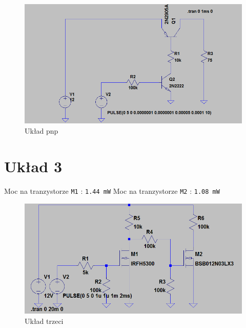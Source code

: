 \documentclass[wide,a4paper,titlepage,12pt] {article}
\begin{document}
  \begin{figure}[h!]
  \begin{center}
  \includegraphics[scale=.5]{ukl2-pnp.PNG}
  \caption{Układ pnp}
  \label{fig:main}
  \end{center}
  \end{figure}

\newpage

  \section{Układ 3}
  \paragraph{}
  Moc na tranzystorze \texttt{M1} : \texttt{1.44 mW}
  Moc na tranzystorze \texttt{M2} : \texttt{1.08 mW}
    \begin{figure}[h!]
  \begin{center}
  \includegraphics[scale=.5]{ukl3.PNG}
  \caption{Układ trzeci}
  \label{fig:main}
  \end{center}
  \end{figure}

\newpage
\end{document}
